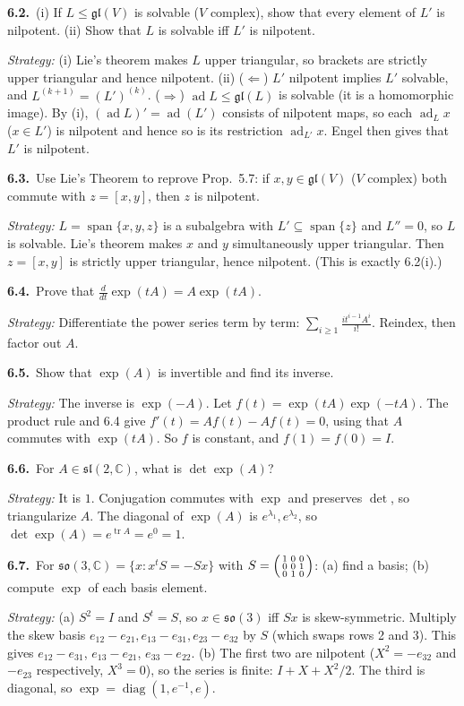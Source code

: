 \documentclass[11pt]{article}
\DeclareMathOperator{\ad}{ad}
\DeclareMathOperator{\tr}{tr}
\DeclareMathOperator{\Span}{span}
\newcommand{\gl}{\mathfrak{gl}}
\newcommand{\so}{\mathfrak{so}}
\renewcommand{\sl}{\mathfrak{sl}}
\newcommand{\prob}[3]{%
	\par\medskip\noindent\textbf{#1.}\ #2\par
	\noindent\hspace*{1.5em}\begin{minipage}[t]{\dimexpr\linewidth-1.5em}
		\textit{Strategy:} #3
	\end{minipage}\par}
\begin{document}
\prob{6.2}{(i) If $L \le \gl(V)$ is solvable ($V$ complex), show that every element of $L'$ is nilpotent.
	(ii) Show that $L$ is solvable iff $L'$ is nilpotent.}
{(i) Lie's theorem makes $L$ upper triangular, so brackets are strictly upper triangular and hence nilpotent.
	(ii) ($\Leftarrow$) $L'$ nilpotent implies $L'$ solvable, and $L^{(k+1)} = (L')^{(k)}$.
	($\Rightarrow$) $\ad L \le \gl(L)$ is solvable (it is a homomorphic image).
	By (i), $(\ad L)' = \ad(L')$ consists of nilpotent maps, so each $\ad_L x$ ($x \in L'$) is nilpotent and hence so is its restriction $\ad_{L'} x$.
	Engel then gives that $L'$ is nilpotent.}

\prob{6.3}{Use Lie's Theorem to reprove Prop.~5.7: if $x,y \in \gl(V)$ ($V$ complex) both commute with $z = [x,y]$, then $z$ is nilpotent.}
{$L = \Span\{x,y,z\}$ is a subalgebra with $L' \subseteq \Span\{z\}$ and $L'' = 0$, so $L$ is solvable.
	Lie's theorem makes $x$ and $y$ simultaneously upper triangular.
	Then $z = [x,y]$ is strictly upper triangular, hence nilpotent.
	(This is exactly 6.2(i).)}

\prob{6.4}{Prove that $\frac{d}{dt}\exp(tA) = A\exp(tA)$.}
{Differentiate the power series term by term: $\sum_{i \ge 1} \frac{i t^{i-1}A^i}{i!}$.
	Reindex, then factor out $A$.}

\prob{6.5}{Show that $\exp(A)$ is invertible and find its inverse.}
{The inverse is $\exp(-A)$.
	Let $f(t) = \exp(tA)\exp(-tA)$.
	The product rule and 6.4 give $f'(t) = A f(t) - A f(t) = 0$, using that $A$ commutes with $\exp(tA)$.
	So $f$ is constant, and $f(1) = f(0) = I$.}

\prob{6.6}{For $A \in \sl(2,\mathbb{C})$, what is $\det\exp(A)$?}
{It is $1$.
	Conjugation commutes with $\exp$ and preserves $\det$, so triangularize $A$.
	The diagonal of $\exp(A)$ is $e^{\lambda_1}, e^{\lambda_2}$, so $\det\exp(A) = e^{\tr A} = e^0 = 1$.}

\prob{6.7}{For $\so(3,\mathbb{C}) = \{x : x^tS = -Sx\}$ with $S = \begin{psmallmatrix}1&0&0\\0&0&1\\0&1&0\end{psmallmatrix}$: (a) find a basis; (b) compute $\exp$ of each basis element.}
{(a) $S^2 = I$ and $S^t = S$, so $x \in \so(3)$ iff $Sx$ is skew-symmetric.
	Multiply the skew basis $e_{12}-e_{21}, e_{13}-e_{31}, e_{23}-e_{32}$ by $S$ (which swaps rows 2 and 3).
	This gives $e_{12}-e_{31}$, $e_{13}-e_{21}$, $e_{33}-e_{22}$.
	(b) The first two are nilpotent ($X^2 = -e_{32}$ and $-e_{23}$ respectively, $X^3 = 0$), so the series is finite: $I + X + X^2/2$.
	The third is diagonal, so $\exp = \operatorname{diag}(1, e^{-1}, e)$.}
\end{document}
